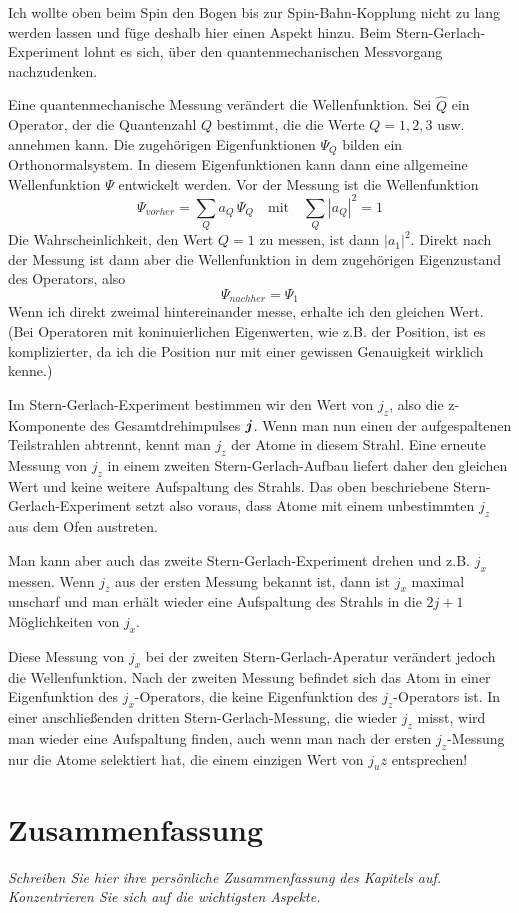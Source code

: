 Ich wollte oben beim Spin den Bogen bis zur Spin-Bahn-Kopplung nicht zu lang werden lassen und füge deshalb hier einen Aspekt hinzu. Beim Stern-Gerlach-Experiment lohnt es sich, über den quantenmechanischen Messvorgang nachzudenken. 

Eine quantenmechanische Messung verändert die Wellenfunktion. Sei $\hat{Q}$ ein Operator, der die Quantenzahl $Q$ bestimmt, die die Werte $Q=1,2,3$ usw. annehmen kann. Die zugehörigen Eigenfunktionen $\Psi_Q$ bilden ein Orthonormalsystem. In diesem Eigenfunktionen kann dann eine allgemeine Wellenfunktion $\Psi$ entwickelt werden. Vor der Messung ist die Wellenfunktion
\begin{equation}
    \Psi_{vorher} = \sum_Q a_Q  \, \Psi_Q \quad \text{mit} \quad \sum_Q |a_Q|^2 = 1
\end{equation}
Die Wahrscheinlichkeit, den Wert $Q=1$ zu messen, ist dann $|a_1|^2$. Direkt nach der Messung ist dann aber die Wellenfunktion in dem zugehörigen Eigenzustand des Operators, also 
\begin{equation}
    \Psi_{nachher} = \Psi_1
\end{equation}
Wenn ich direkt zweimal hintereinander messe, erhalte ich den gleichen Wert. (Bei Operatoren mit koninuierlichen Eigenwerten, wie z.B. der Position, ist es komplizierter, da ich die Position nur mit einer gewissen Genauigkeit wirklich kenne.)


Im Stern-Gerlach-Experiment bestimmen wir den Wert von $j_z$, also die z-Komponente des Gesamtdrehimpulses $\boldsymbol{j}$. Wenn man nun einen der aufgespaltenen Teilstrahlen abtrennt, kennt man $j_z$ der Atome in diesem Strahl. Eine erneute Messung von $j_z$ in einem zweiten Stern-Gerlach-Aufbau liefert daher den gleichen Wert und keine weitere Aufspaltung des Strahls. Das oben beschriebene Stern-Gerlach-Experiment setzt also voraus, dass Atome mit einem unbestimmten $j_z$ aus dem Ofen austreten.


Man kann aber auch das zweite Stern-Gerlach-Experiment drehen und z.B. $j_x$ messen. Wenn $j_z$ aus der ersten Messung bekannt ist, dann ist $j_x$ maximal unscharf und man erhält wieder eine Aufspaltung des Strahls in die $2j+1$ Möglichkeiten von $j_x$.

Diese Messung von $j_x$ bei der zweiten Stern-Gerlach-Aperatur verändert jedoch die Wellenfunktion. Nach der zweiten Messung befindet sich das Atom in einer Eigenfunktion des $j_x$-Operators, die keine Eigenfunktion des $j_z$-Operators ist. In einer anschließenden dritten Stern-Gerlach-Messung, die wieder $j_z$ misst, wird man wieder eine Aufspaltung finden, auch wenn man nach der ersten $j_z$-Messung nur die Atome selektiert hat, die einem einzigen Wert von $j_uz$ entsprechen!


\section{Zusammenfassung}

\textit{Schreiben Sie hier ihre persönliche Zusammenfassung des Kapitels auf. Konzentrieren Sie sich auf die wichtigsten Aspekte.}

\vspace*{10cm}



\printbibliography[segment=\therefsegment,heading=subbibliography]
